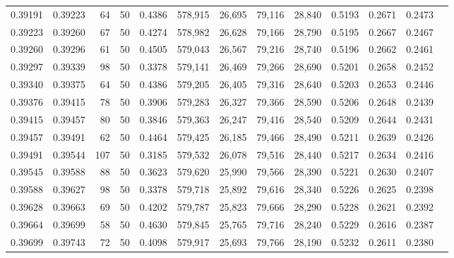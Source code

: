 \begin{tabular}{rrrrrrrrrrrrr}
0.39191 & 0.39223 &    64 &  50 &                                     0.4386 & 578,915 &  26,695 &  79,116 &  28,840 & 0.5193 & 0.2671 & 0.2473 \\
0.39223 & 0.39260 &    67 &  50 &                                     0.4274 & 578,982 &  26,628 &  79,166 &  28,790 & 0.5195 & 0.2667 & 0.2467 \\
0.39260 & 0.39296 &    61 &  50 &                                     0.4505 & 579,043 &  26,567 &  79,216 &  28,740 & 0.5196 & 0.2662 & 0.2461 \\
0.39297 & 0.39339 &    98 &  50 &                                     0.3378 & 579,141 &  26,469 &  79,266 &  28,690 & 0.5201 & 0.2658 & 0.2452 \\
0.39340 & 0.39375 &    64 &  50 &                                     0.4386 & 579,205 &  26,405 &  79,316 &  28,640 & 0.5203 & 0.2653 & 0.2446 \\
0.39376 & 0.39415 &    78 &  50 &                                     0.3906 & 579,283 &  26,327 &  79,366 &  28,590 & 0.5206 & 0.2648 & 0.2439 \\
0.39415 & 0.39457 &    80 &  50 &                                     0.3846 & 579,363 &  26,247 &  79,416 &  28,540 & 0.5209 & 0.2644 & 0.2431 \\
0.39457 & 0.39491 &    62 &  50 &                                     0.4464 & 579,425 &  26,185 &  79,466 &  28,490 & 0.5211 & 0.2639 & 0.2426 \\
0.39491 & 0.39544 &   107 &  50 &                                     0.3185 & 579,532 &  26,078 &  79,516 &  28,440 & 0.5217 & 0.2634 & 0.2416 \\
0.39545 & 0.39588 &    88 &  50 &                                     0.3623 & 579,620 &  25,990 &  79,566 &  28,390 & 0.5221 & 0.2630 & 0.2407 \\
0.39588 & 0.39627 &    98 &  50 &                                     0.3378 & 579,718 &  25,892 &  79,616 &  28,340 & 0.5226 & 0.2625 & 0.2398 \\
0.39628 & 0.39663 &    69 &  50 &                                     0.4202 & 579,787 &  25,823 &  79,666 &  28,290 & 0.5228 & 0.2621 & 0.2392 \\
0.39664 & 0.39699 &    58 &  50 &                                     0.4630 & 579,845 &  25,765 &  79,716 &  28,240 & 0.5229 & 0.2616 & 0.2387 \\
0.39699 & 0.39743 &    72 &  50 &                                     0.4098 & 579,917 &  25,693 &  79,766 &  28,190 & 0.5232 & 0.2611 & 0.2380 \\

\end{tabular}
